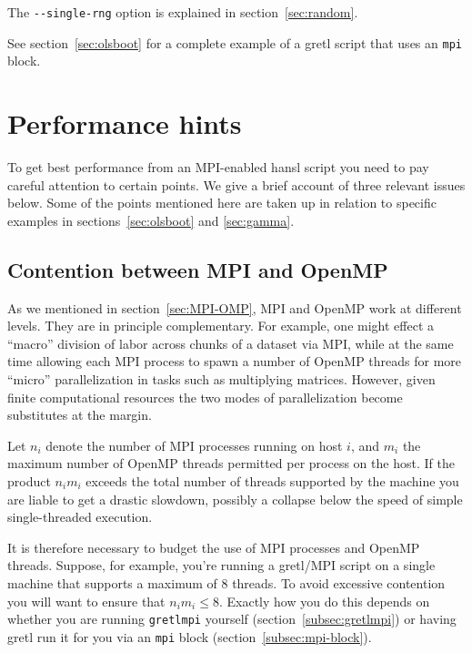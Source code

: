 \documentclass{article}
\begin{document}
The \verb|--single-rng| option is explained in
section~\ref{sec:random}.

\vspace{1ex}

See section~\ref{sec:olsboot} for a complete example of a gretl script
that uses an \texttt{mpi} block.

\section{Performance hints}
\label{sec:performance}

To get best performance from an MPI-enabled hansl script you need to
pay careful attention to certain points. We give a brief account of
three relevant issues below. Some of the points mentioned here are
taken up in relation to specific examples in
sections~\ref{sec:olsboot} and \ref{sec:gamma}.

\subsection{Contention between MPI and OpenMP}
\label{sec:contention}

As we mentioned in section~\ref{sec:MPI-OMP}, MPI and \textsf{OpenMP}
work at different levels. They are in principle complementary. For
example, one might effect a ``macro'' division of labor across chunks
of a dataset via MPI, while at the same time allowing each MPI process
to spawn a number of \textsf{OpenMP} threads for more ``micro''
parallelization in tasks such as multiplying matrices.
However, given finite computational resources the two modes of
parallelization become substitutes at the margin.

Let $n_i$ denote the number of MPI processes running on host $i$,
and $m_i$ the maximum number of \textsf{OpenMP} threads permitted per
process on the host. If the product $n_im_i$ exceeds the total number
of threads supported by the machine you are liable to get a drastic
slowdown, possibly a collapse below the speed of simple
single-threaded execution.

It is therefore necessary to budget the use of MPI processes and
\textsf{OpenMP} threads. Suppose, for example, you're running a
gretl/MPI script on a single machine that supports a maximum of 8
threads. To avoid excessive contention you will want to ensure that
$n_im_i \leq 8$. Exactly how you do this depends on whether you are
running \texttt{gretlmpi} yourself
(section~\ref{subsec:gretlmpi}) or having gretl run it for you via
an \texttt{mpi} block (section~\ref{subsec:mpi-block}).
\end{document}
